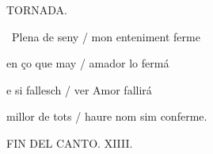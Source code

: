 \documentclass[12pt]{article}
\begin{document}
\begin{estrofaExtra}%




\begin{tornada}

TORNADA.

\end{tornada}


\end{estrofaExtra}


\begin{estrofa}

 \textparagraph\  Plena de seny / mon enteniment ferme

 en \c{c}o que may / amador lo ferm\'{a}

 e si fallesch / ver Amor fallir\'{a}

 millor de tots / haure nom sim conferme.

\end{estrofa}



\begin{estrofaExtra}%

\begin{final}

FIN DEL CANTO. XIIII.

\end{final}

\end{estrofaExtra}
\end{document}
